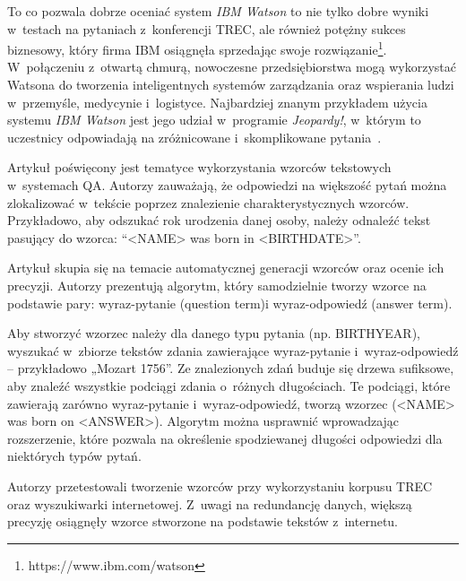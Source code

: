 To co pozwala dobrze oceniać system \emph{IBM Watson} to nie tylko dobre wyniki w~testach na pytaniach z~konferencji TREC, ale również potężny sukces biznesowy, który firma IBM osiągnęła sprzedając swoje rozwiązanie\footnote{https://www.ibm.com/watson}. W~połączeniu z~otwartą chmurą, nowoczesne przedsiębiorstwa mogą wykorzystać Watsona do tworzenia inteligentnych systemów zarządzania oraz wspierania ludzi w~przemyśle, medycynie i~logistyce. Najbardziej znanym przykładem użycia systemu \emph{IBM Watson} jest jego udział w~programie \emph{Jeopardy!}, w~którym to uczestnicy odpowiadają na zróżnicowane i~skomplikowane pytania~\cite{lapshin2012question}. 

Artykuł \cite{ravichandran-hovy-2002-learning} poświęcony jest tematyce wykorzystania wzorców tekstowych w~systemach QA. Autorzy zauważają, że odpowiedzi na większość pytań można zlokalizować w~tekście poprzez znalezienie charakterystycznych wzorców. Przykładowo, aby odszukać rok urodzenia danej osoby, należy odnaleźć tekst pasujący do wzorca: “<NAME> was born in <BIRTHDATE>”.

Artykuł skupia się na temacie automatycznej generacji wzorców oraz ocenie ich precyzji. Autorzy prezentują algorytm, który samodzielnie tworzy wzorce na podstawie pary: wyraz-pytanie (question term)i wyraz-odpowiedź (answer term). 

Aby stworzyć wzorzec należy dla danego typu pytania (np. BIRTHYEAR), wyszukać w~zbiorze tekstów zdania zawierające wyraz-pytanie i~wyraz-odpowiedź  – przykładowo „Mozart 1756”. Ze znalezionych zdań buduje się drzewa sufiksowe, aby znaleźć wszystkie podciągi zdania o~różnych długościach. Te podciągi, które zawierają zarówno wyraz-pytanie i~wyraz-odpowiedź, tworzą wzorzec (<NAME> was born on <ANSWER>). Algorytm można usprawnić wprowadzając rozszerzenie, które pozwala na określenie spodziewanej długości odpowiedzi dla niektórych typów pytań. 

Autorzy przetestowali tworzenie wzorców przy wykorzystaniu korpusu TREC oraz wyszukiwarki internetowej. Z~uwagi na redundancję danych, większą precyzję osiągnęły wzorce stworzone na podstawie tekstów z~internetu. 

